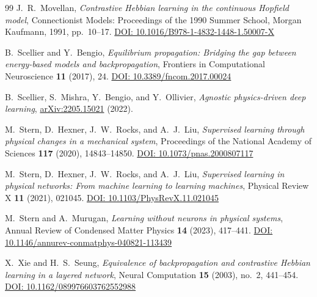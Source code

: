 \documentclass{siamart}
\begin{document}
\begin{thebibliography}{99}
J.~R.~Movellan,
\textit{Contrastive {H}ebbian learning in the continuous {H}opfield model},
Connectionist Models: Proceedings of the 1990 Summer School, Morgan Kaufmann, 1991, pp.~10--17.
\href{https://doi.org/10.1016/B978-1-4832-1448-1.50007-X}{DOI: 10.1016/B978-1-4832-1448-1.50007-X}

B.~Scellier and Y.~Bengio,
\textit{Equilibrium propagation: Bridging the gap between energy-based models and backpropagation},
Frontiers in Computational Neuroscience \textbf{11} (2017), 24.
\href{https://doi.org/10.3389/fncom.2017.00024}{DOI: 10.3389/fncom.2017.00024}

B.~Scellier, S.~Mishra, Y.~Bengio, and Y.~Ollivier,
\textit{Agnostic physics-driven deep learning},
\href{https://arxiv.org/abs/2205.15021}{arXiv:2205.15021} (2022).

M.~Stern, D.~Hexner, J.~W.~Rocks, and A.~J.~Liu,
\textit{Supervised learning through physical changes in a mechanical system},
Proceedings of the National Academy of Sciences \textbf{117} (2020), 14843--14850.
\href{https://doi.org/10.1073/pnas.2000807117}{DOI: 10.1073/pnas.2000807117}

M.~Stern, D.~Hexner, J.~W.~Rocks, and A.~J.~Liu,
\textit{Supervised learning in physical networks: From machine learning to learning machines},
Physical Review X \textbf{11} (2021), 021045.
\href{https://doi.org/10.1103/PhysRevX.11.021045}{DOI: 10.1103/PhysRevX.11.021045}

M.~Stern and A.~Murugan,
\textit{Learning without neurons in physical systems},
Annual Review of Condensed Matter Physics \textbf{14} (2023), 417--441.
\href{https://doi.org/10.1146/annurev-conmatphys-040821-113439}{DOI: 10.1146/annurev-conmatphys-040821-113439}

X.~Xie and H.~S.~Seung,
\textit{Equivalence of backpropagation and contrastive {H}ebbian learning in a layered network},
Neural Computation \textbf{15} (2003), no.~2, 441--454.
\href{https://doi.org/10.1162/089976603762552988}{DOI: 10.1162/089976603762552988}

\end{thebibliography}
\end{document}
